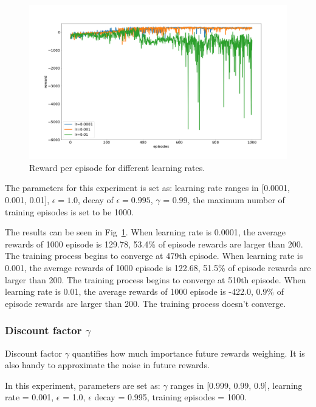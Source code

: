 \documentclass[conference]{IEEEtran}
\begin{document}
\begin{figure}[htbp]
\includegraphics[width=\linewidth]{lr.png}
\caption{Reward per episode for different learning rates.}
\label{fig11}
\end{figure}

The parameters for this experiment is set as: learning rate ranges in [0.0001, 0.001, 0.01], $\epsilon = 1.0$, decay of $\epsilon= 0.995$, $\gamma$ = 0.99, the maximum number of training episodes is set to be 1000.

The results can be seen in Fig~\ref{fig11}. When learning rate is 0.0001, the average rewards of 1000 episode is 129.78, 53.4\% of episode rewards are larger than 200. The training process begins to converge at 479th episode. When learning rate is 0.001, the average rewards of 1000 episode is 122.68, 51.5\% of episode rewards are larger than 200. The training process begins to converge at 510th episode. When learning rate is 0.01, the average rewards of 1000 episode is -422.0, 0.9\% of episode rewards are larger than 200. The training process doesn't converge. 

\subsubsection{Discount factor $\gamma$}\label{sec:gamma}

Discount factor $\gamma$ quantifies how much importance future rewards weighing. It is also handy to approximate the noise in future rewards.

In this experiment, parameters are set as: $\gamma$ ranges in [0.999, 0.99, 0.9], learning rate = 0.001, $\epsilon$ = 1.0, $\epsilon$ decay = 0.995, training episodes = 1000.
\end{document}
